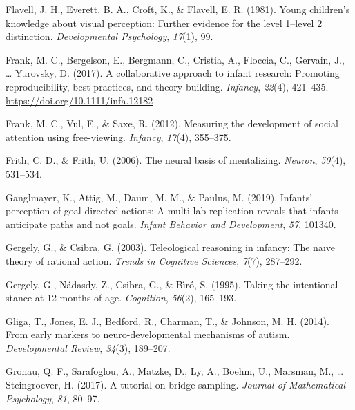 \documentclass[
  english,
  man,floatsintext]{apa6}
\newlength{\cslhangindent}
\newlength{\cslentryspacingunit} %
\newenvironment{CSLReferences}[2] %
 {%
  \setlength{\parindent}{0pt}
  \ifodd #1
  \let\oldpar\par
  \def\par{\hangindent=\cslhangindent\oldpar}
  \fi
  \setlength{\parskip}{#2\cslentryspacingunit}
 }%
 {}
\begin{document}
\begin{CSLReferences}{1}{0}
\leavevmode{}%
Flavell, J. H., Everett, B. A., Croft, K., \& Flavell, E. R. (1981). Young children's knowledge about visual perception: Further evidence for the level 1--level 2 distinction. \emph{Developmental Psychology}, \emph{17}(1), 99.

\leavevmode{}%
Frank, M. C., Bergelson, E., Bergmann, C., Cristia, A., Floccia, C., Gervain, J., \ldots{} Yurovsky, D. (2017). A collaborative approach to infant research: Promoting reproducibility, best practices, and theory-building. \emph{Infancy}, \emph{22}(4), 421--435. \url{https://doi.org/10.1111/infa.12182}

\leavevmode{}%
Frank, M. C., Vul, E., \& Saxe, R. (2012). Measuring the development of social attention using free-viewing. \emph{Infancy}, \emph{17}(4), 355--375.

\leavevmode{}%
Frith, C. D., \& Frith, U. (2006). The neural basis of mentalizing. \emph{Neuron}, \emph{50}(4), 531--534.

\leavevmode{}%
Ganglmayer, K., Attig, M., Daum, M. M., \& Paulus, M. (2019). Infants' perception of goal-directed actions: A multi-lab replication reveals that infants anticipate paths and not goals. \emph{Infant Behavior and Development}, \emph{57}, 101340.

\leavevmode{}%
Gergely, G., \& Csibra, G. (2003). Teleological reasoning in infancy: The na{ı}ve theory of rational action. \emph{Trends in Cognitive Sciences}, \emph{7}(7), 287--292.

\leavevmode{}%
Gergely, G., Nádasdy, Z., Csibra, G., \& Bı́ró, S. (1995). Taking the intentional stance at 12 months of age. \emph{Cognition}, \emph{56}(2), 165--193.

\leavevmode{}%
Gliga, T., Jones, E. J., Bedford, R., Charman, T., \& Johnson, M. H. (2014). From early markers to neuro-developmental mechanisms of autism. \emph{Developmental Review}, \emph{34}(3), 189--207.

\leavevmode{}%
Gronau, Q. F., Sarafoglou, A., Matzke, D., Ly, A., Boehm, U., Marsman, M., \ldots{} Steingroever, H. (2017). A tutorial on bridge sampling. \emph{Journal of Mathematical Psychology}, \emph{81}, 80--97.


\end{CSLReferences}
\end{document}

